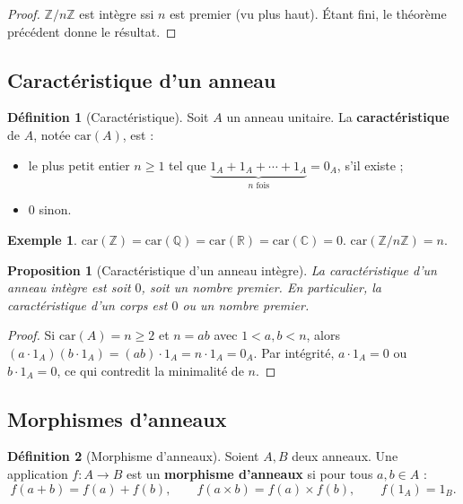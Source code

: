 \documentclass[12pt,a4paper]{report}
\newtheorem{proposition}[theoreme]{Proposition}
\theoremstyle{definition}
\newtheorem{definition}{Définition}[section]
\newtheorem{exemple}{Exemple}[section]
\theoremstyle{remark}
\begin{document}
\begin{proof}
$\mathbb{Z}/n\mathbb{Z}$ est intègre ssi $n$ est premier (vu plus haut). Étant fini, le théorème précédent donne le résultat.
\end{proof}

\subsection{Caractéristique d'un anneau}

\begin{definition}[Caractéristique]
Soit $A$ un anneau unitaire. La \textbf{caractéristique} de $A$, notée $\mathrm{car}(A)$, est :
\begin{itemize}
    \item le plus petit entier $n \ge 1$ tel que $\underbrace{1_A + 1_A + \cdots + 1_A}_{n \text{ fois}} = 0_A$, s'il existe ;
    \item $0$ sinon.
\end{itemize}
\end{definition}

\begin{exemple}
$\mathrm{car}(\mathbb{Z}) = \mathrm{car}(\mathbb{Q}) = \mathrm{car}(\mathbb{R}) = \mathrm{car}(\mathbb{C}) = 0$.
$\mathrm{car}(\mathbb{Z}/n\mathbb{Z}) = n$.
\end{exemple}

\begin{proposition}[Caractéristique d'un anneau intègre]
La caractéristique d'un anneau intègre est soit $0$, soit un nombre premier. En particulier, la caractéristique d'un corps est $0$ ou un nombre premier.
\end{proposition}

\begin{proof}
Si $\mathrm{car}(A) = n \ge 2$ et $n = ab$ avec $1 < a, b < n$, alors $(a \cdot 1_A)(b \cdot 1_A) = (ab) \cdot 1_A = n \cdot 1_A = 0_A$. Par intégrité, $a \cdot 1_A = 0$ ou $b \cdot 1_A = 0$, ce qui contredit la minimalité de $n$.
\end{proof}

\subsection{Morphismes d'anneaux}

\begin{definition}[Morphisme d'anneaux]
Soient $A, B$ deux anneaux. Une application $f : A \to B$ est un \textbf{morphisme d'anneaux} si pour tous $a, b \in A$ :
\[ f(a + b) = f(a) + f(b), \qquad f(a \times b) = f(a) \times f(b), \qquad f(1_A) = 1_B. \]
\end{definition}
\end{document}
